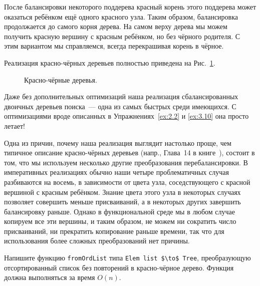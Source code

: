 После балансировки некоторого поддерева красный корень этого поддерева
может оказаться ребёнком ещё одного красного узла. Таким образом,
балансировка продолжается до самого корня дерева. На самом верху
дерева мы можем получить красную вершину с красным ребёнком, но без
чёрного родителя. С этим вариантом мы справляемся, всегда перекрашивая корень
в чёрное.

Реализация красно-чёрных деревьев полностью приведена на Рис.~\ref{fig:3.6}.

\begin{figure}
  \centering
  
  \caption{Красно-чёрные деревья.}
  \label{fig:3.6}
\end{figure}

\begin{hint}
  Даже без дополнительных оптимизаций наша реализация сбалансированных
  двоичных деревьев поиска~--- одна из самых быстрых среди
  имеющихся. С оптимизациями вроде описанных в
  Упражнениях~\ref{ex:2.2} и \ref{ex:3.10} она просто летает!
\end{hint}

\begin{remark}
  Одна из причин, почему наша реализация выглядит настолько проще, чем
  типичное описание красно-чёрных деревьев (напр., Глава~14 в
  книге~\cite{CormenLeisersonRivest1990}), состоит в том, что мы
  используем несколько другие преобразования перебалансировки. В
  императивных реализациях обычно наши четыре проблематичных случая
  разбиваются на восемь, в зависимости от цвета узла, соседствующего с
  красной вершиной с красным ребёнком.  Знание цвета этого узла в
  некоторых случаях позволяет совершить меньше присваиваний, а в
  некоторых других завершить балансировку раньше. Однако в
  функциональной среде мы в любом случае копируем все эти вершины, и
  таким образом, не можем ни сократить число присваиваний, ни
  прекратить копирование раньше времени, так что для использования
  более сложных преобразований нет причины.
\end{remark}

\begin{exercise}\label{ex:3.9}
  Напишите функцию \lstinline!fromOrdList! типа \lstinline!Elem list $\to$ Tree!,
  преобразующую отсортированный список без повторений в красно-чёрное
  дерево. Функция должна выполняться за время $O(n)$.
\end{exercise}


